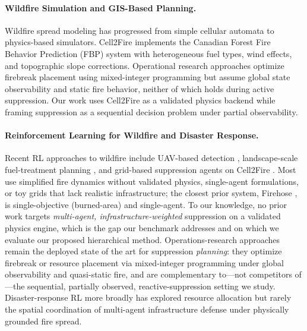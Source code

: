 \documentclass[letterpaper]{article}
\begin{document}
\paragraph{Wildfire Simulation and GIS-Based Planning.}
Wildfire spread modeling has progressed from simple cellular automata to physics-based simulators. Cell2Fire \citep{pais2021cell2fire} implements the Canadian Forest Fire Behavior Prediction (FBP) system with heterogeneous fuel types, wind effects, and topographic slope corrections. Operational research approaches optimize firebreak placement using mixed-integer programming \citep{hu2009wildfire} but assume global state observability and static fire behavior, neither of which holds during active suppression. Our work uses Cell2Fire as a validated physics backend while framing suppression as a sequential decision problem under partial observability.

\paragraph{Reinforcement Learning for Wildfire and Disaster Response.}
Recent RL approaches to wildfire include UAV-based detection \citep{ghali2022, partheepan2023}, landscape-scale fuel-treatment planning \citep{altamimi2022wildfire}, and grid-based suppression agents on Cell2Fire \citep{shen2022firehose}. Most use simplified fire dynamics without validated physics, single-agent formulations, or toy grids that lack realistic infrastructure; the closest prior system, Firehose \citep{shen2022firehose}, is single-objective (burned-area) and single-agent. To our knowledge, no prior work targets \emph{multi-agent, infrastructure-weighted} suppression on a validated physics engine, which is the gap our benchmark addresses and on which we evaluate our proposed hierarchical method. Operations-research approaches remain the deployed state of the art for suppression \emph{planning}: they optimize firebreak or resource placement via mixed-integer programming \citep{hu2009wildfire} under global observability and quasi-static fire, and are complementary to---not competitors of---the sequential, partially observed, reactive-suppression setting we study. Disaster-response RL more broadly has explored resource allocation \citep{nguyen2019disaster} but rarely the spatial coordination of multi-agent infrastructure defense under physically grounded fire spread.
\end{document}
